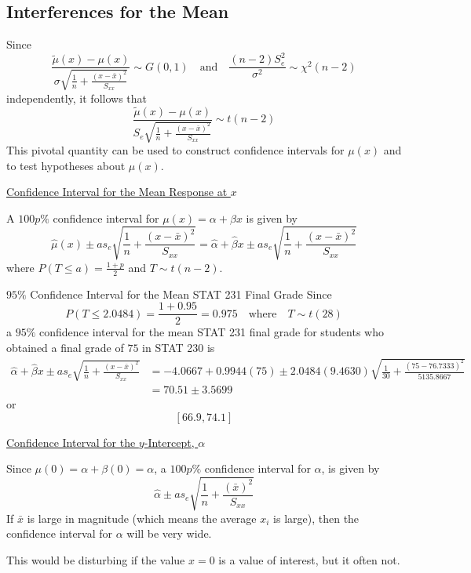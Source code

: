 \subsection{Interferences for the Mean}
Since
\[ \frac{\tilde{\mu}(x)-\mu(x)}{\sigma \sqrt{\frac{1}{n}+\frac{\left( x-\bar{x} \right)^2}{S_{xx}}}}\sim G(0,1)
    \quad\text{and}\quad \frac{(n-2)S_e^2}{\sigma^2}\sim \chi^2(n-2)   \]
independently, it follows that
\[ \frac{\tilde{\mu}(x)-\mu(x)}{S_e \sqrt{\frac{1}{n}+\frac{\left( x-\bar{x} \right)^2}{S_{xx}}}}\sim
    t(n-2) \]
This pivotal quantity can be used to construct confidence intervals for $ \mu(x) $
and to test hypotheses about $ \mu(x) $.

\underline{Confidence Interval for the Mean Response at $ x $}

A $ 100p\% $ confidence interval for $ \mu(x)=\alpha+\beta x $ is given by
\[ \hat{\mu}(x)\pm a s_e\sqrt{\frac{1}{n}+\frac{\left( x-\bar{x} \right)^2}{S_{xx}}}=
    \hat{\alpha}+\hat{\beta}x\pm as_e \sqrt{\frac{1}{n}+\frac{\left( x-\bar{x} \right)^2}{S_{xx}}}\]
where $ P(T\leqslant a)=\frac{1+p}{2} $ and $ T \sim t(n-2) $.


\begin{Example}{$ 95\% $ Confidence Interval for the Mean STAT 231 Final Grade}{}
    Since
    \[ P(T\leqslant 2.0484)=\frac{1+0.95}{2}=0.975\quad\text{where}\quad T\sim t(28) \]
    a $ 95\% $ confidence interval for the mean STAT 231 final grade for students who obtained
    a final grade of $ 75 $ in STAT 230 is
    \begin{align*}
        \hat{\alpha}+\hat{\beta} x \pm a s_{e} \sqrt{\frac{1}{n}+\frac{(x-\bar{x})^{2}}{S_{x x}}}
         & =-4.0667+0.9944(75) \pm 2.0484(9.4630) \sqrt{\frac{1}{30}+\frac{(75-76.7333)^{2}}{5135.8667}} \\
         & =70.51 \pm 3.5699
    \end{align*}
    or
    \[ \left[ 66.9,74.1 \right] \]
\end{Example}


\underline{Confidence Interval for the $ y $-Intercept, $ \alpha $}

Since $ \mu(0)=\alpha+\beta(0)=\alpha $, a $ 100p\% $ confidence interval for $ \alpha $,
is given by
\[ \hat{\alpha}\pm as_e\sqrt{\frac{1}{n} +\frac{\left( \bar{x} \right)^2}{S_{xx}} } \]
If $ \bar{x} $ is large in magnitude (which means the average $ x_i $ is large),
then the confidence interval for $ \alpha $ will be very wide.

This would be disturbing if the value $ x=0 $ is a value of interest, but it often not.

